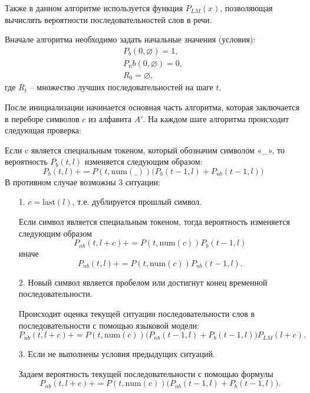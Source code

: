 Также в данном алгоритме используется функция $P_{LM}(x)$, позволяющая вычислять вероятности последовательностей слов в речи.

Вначале алгоритма необходимо задать начальные значения (условия):
\begin{equation}
    \begin{array}{c}
        P_b(0, \varnothing) = 1,\\ 
        P_nb(0,\varnothing) = 0,\\ 
        R_0 = \varnothing,
    \end{array}
\end{equation}
где $R_t$ -- множество лучших последовательностей на шаге $t$.


После инициализации начинается основная часть алгоритма, которая заключается в переборе символов $c$ из алфавита $A'$. На каждом шаге алгоритма происходит следующая проверка:

Если c является специальным токеном, который обозначим символом «\_», то вероятность $P_b(t,l)$ изменяется следующим образом:
\begin{equation}
    P_b(t,l)\mathrel{{+}{=}} P(t,\text{num}(\_))\bigl(P_b(t-1,l)+P_{nb}(t-1,l)\bigr)
\end{equation}
В противном случае возможны 3 ситуации:
\begin{itemize}
    \item[1.] $c = \text{last}(l)$, т.е. дублируется прошлый символ.

        Если символ является специальным токеном, тогда вероятность изменяется следующим образом
        \begin{equation}
            P_{nb}(t,l+c)\mathrel{{+}{=}} P(t,\text{num}(c))P_b(t-1,l)
        \end{equation}
        иначе
        \begin{equation}
            P_{nb}(t,l)\mathrel{{+}{=}}P(t,\text{num}(c))P_{nb}(t-1,l).
        \end{equation}
    \item[2.] Новый символ является пробелом или достигнут конец временной последовательности.

        Происходит оценка текущей ситуации последовательности слов в последовательности с помощью языковой модели:
        \begin{equation}
            P_{nb}(t,l+c)\mathrel{{+}{=}}P(t,\text{num}(c))\bigl(P_{nb}(t-1,l)+P_b(t-1,l)\bigr)P_{LM}(l+c).
        \end{equation}
    \item[3.] Если не выполнены условия предыдущих ситуаций.

        Задаем вероятность текущей последовательности с помощью формулы
        \begin{equation}
            P_{nb}(t,l+c)\mathrel{{+}{=}}P(t,\text{num}(c))\bigl(P_{nb}(t-1,l)+P_b(t-1,l)\bigr).
        \end{equation}
\end{itemize}

